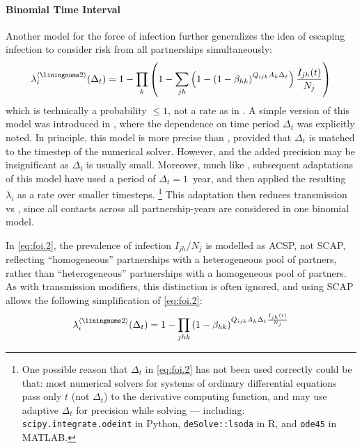 \paragraph{ Binomial Time Interval}
Another model for the force of infection
further generalizes the idea of escaping infection to consider
risk from all partnerships simultaneously:
\begin{equation}\label{eq:foi.2}
  \lambda_i^{\case{2}}(\Delta_t) =
  1 - \prod_{k}\left(1 - \sum_{jh} \left(1 -
  {\left(1 - \beta_{hk}\right)}^{Q_{ijk} A_k \Delta_t}\right) \frac{I_{jh}(t)}{N_j}\right)
\end{equation}
which is technically a probability $\le 1$, not a rate as in .
A simple version of this model was introduced in \cite{Auvert1990},
where the dependence on time period $\Delta_t$ was explicitly noted.
In principle, this model is more precise than ,
provided that $\Delta_t$ is matched to the timestep of the numerical solver.
However, and the added precision may be insignificant as $\Delta_t$ is usually small.
Moreover, much like , subsequent adaptations of this model have
used a period of $\Delta_t = 1$~year,
and then applied the resulting $\lambda_i$ as a rate over smaller timesteps.%
\footnote{One possible reason that $\Delta_t$ in \eqref{eq:foi.2}
  has not been used correctly could be that:
  most numerical solvers for systems of ordinary differential equations
  pass only $t$ (not $\Delta_t$) to the derivative computing function,
  and may use adaptive $\Delta_t$ for precision while solving --- including:
  \texttt{scipy.integrate.odeint} in Python,
  \texttt{deSolve::lsoda} in R, and
  \texttt{ode45} in MATLAB.}
This adaptation then reduces transmission vs ,
since all contacts across all partnership-years
are considered in one binomial model.
\par
In \eqref{eq:foi.2}, the prevalence of infection $I_{jh}/N_j$ is modelled as ACSP, not SCAP,
reflecting ``homogeneous'' partnerships with a heterogeneous pool of partners, rather than
``heterogeneous'' partnerships with a homogeneous pool of partners.
As with transmission modifiers, this distinction is often ignored,
and using SCAP allows the following simplification of \eqref{eq:foi.2}:%
\begin{equation}\label{eq:foi.2bi}
  \lambda_i^{\case{2}}(\Delta_t) =
  1 - \prod_{jhk}{\left(1 - \beta_{hk}\right)}^{Q_{ijk} A_k \Delta_t \frac{I_{jh}(t)}{N_j}}
\end{equation}
